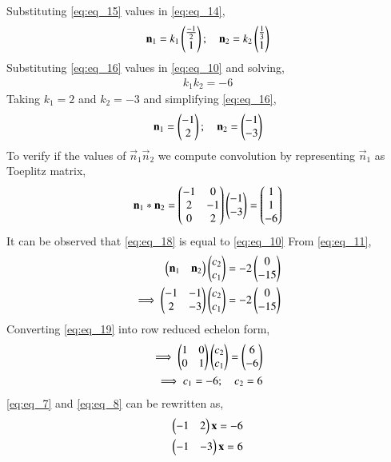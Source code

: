 \documentclass[journal,12pt,twocolumn]{IEEEtran}
\begin{document}
Substituting \eqref{eq:eq_15} values in \eqref{eq:eq_14},
\begin{align}
    \mathbf{n}_1=k_1\begin{pmatrix}\frac{-1}{2} \\ 1\end{pmatrix}; \quad \mathbf{n}_2=k_2\begin{pmatrix}\frac{1}{3} \\ 1\end{pmatrix} \label{eq:eq_16}
\end{align}
Substituting \eqref{eq:eq_16} values in \eqref{eq:eq_10} and solving,
\begin{align}
    k_1k_2=-6 \nonumber
\end{align}
Taking $k_1 = 2$ and $k_2 = -3$ and simplifying \eqref{eq:eq_16},
\begin{align} \label{eq:eq_17}
    \mathbf{n}_1 = \begin{pmatrix}-1 \\ 2\end{pmatrix}; \quad \mathbf{n}_2 = \begin{pmatrix}-1 \\ -3\end{pmatrix} 
\end{align}
To verify if the values of $\vec{n}_1 \vec{n}_2$ we compute convolution by representing $\vec{n}_1$ as Toeplitz matrix,
\begin{align}
    \mathbf{n}_1*\mathbf{n}_2=\begin{pmatrix}-1 & 0 \\ 2 & -1 \\ 0 & 2\end{pmatrix}\begin{pmatrix}-1 \\ -3\end{pmatrix} = \begin{pmatrix}1 \\ 1 \\ -6\end{pmatrix} \label{eq:eq_18}
\end{align}
It can be observed that \eqref{eq:eq_18} is equal to \eqref{eq:eq_10}
From \eqref{eq:eq_11},
\begin{align}
    \begin{pmatrix}\mathbf{n}_1 & \mathbf{n}_2\end{pmatrix}\begin{pmatrix}c_2 \\ c_1\end{pmatrix} = -2\begin{pmatrix}0 \\ -15\end{pmatrix} \nonumber \\
    \implies \begin{pmatrix}-1 & -1 \\ 2 & -3\end{pmatrix}\begin{pmatrix}c_2 \\ c_1\end{pmatrix} = -2\begin{pmatrix}0 \\ -15\end{pmatrix} \label{eq:eq_19}
\end{align}
Converting \eqref{eq:eq_19} into row reduced echelon form,
\begin{align}
    \implies \begin{pmatrix}1 & 0 \\ 0 & 1\end{pmatrix}\begin{pmatrix}c_2 \\ c_1\end{pmatrix} = \begin{pmatrix}6 \\ -6\end{pmatrix} \nonumber\\
    \implies c_1 = -6; \quad c_2 = 6 \label{eq:eq_20}
\end{align}
\eqref{eq:eq_7} and \eqref{eq:eq_8} can be rewritten as,
\begin{align}
    \begin{pmatrix}-1 & 2\end{pmatrix}\mathbf{x} = -6 \\
    \begin{pmatrix}-1 & -3\end{pmatrix}\mathbf{x} = 6
\end{align}
\end{document}
